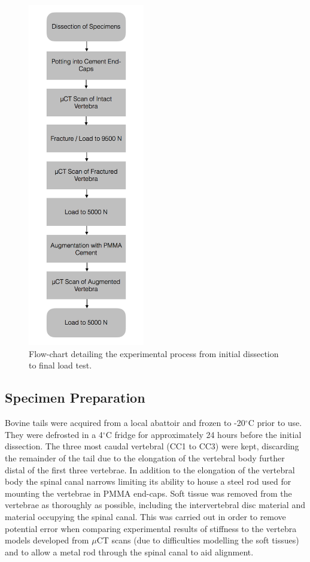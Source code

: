 \begin{figure}[ht!]
\centering
\includegraphics[width=2in]{images/Exp_FlowChart.png}
\caption{Flow-chart detailing the experimental process from initial dissection to final load test.}
\label{fig:exp_flowchart}
\end{figure}

\subsection{Specimen Preparation}\label{specimen-preparation-bov}

Bovine tails were acquired from a local abattoir and frozen to -20$^\circ$C
prior to use.  They were defrosted in a 4\(^\circ\)C fridge for approximately
24 hours before the initial dissection. The three most caudal vertebral (CC1 to
CC3) were kept, discarding the remainder of the tail due to the elongation of
the vertebral body further distal of the first three vertebrae. In addition to
the elongation of the vertebral body the spinal canal narrows limiting its
ability to house a steel rod used for mounting the vertebrae in PMMA end-caps.
Soft tissue was removed from the vertebrae as thoroughly as possible, including
the intervertebral disc material and material occupying the spinal canal. This
was carried out in order to remove potential error when comparing experimental
results of stiffness to the vertebra models developed from $\mu$CT scans (due
to difficulties modelling the soft tissues) and to allow a metal rod through
the spinal canal to aid alignment.


